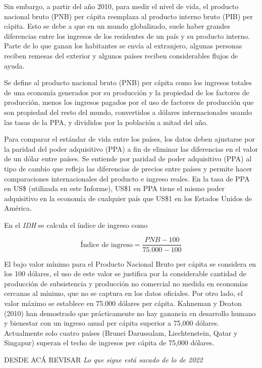 \documentclass[
  10pt,
]{article}
\begin{document}
Sin embargo, a partir del año 2010, para medir el nivel de vida, el
producto nacional bruto (PNB) per cápita reemplaza al producto interno
bruto (PIB) per cápita. Esto se debe a que en un mundo globalizado,
suele haber grandes diferencias entre los ingresos de los residentes de
un país y su producto interno. Parte de lo que ganan los habitantes se
envía al extranjero, algunas personas reciben remesas del exterior y
algunos países reciben considerables flujos de ayuda.

Se define al producto nacional bruto (PNB) per cápita como los ingresos
totales de una economía generados por su producción y la propiedad de
los factores de producción, menos los ingresos pagados por el uso de
factores de producción que son propiedad del resto del mundo,
convertidos a dólares internacionales usando las tasas de la PPA, y
divididos por la población a mitad del año.

Para comparar el estándar de vida entre los países, los datos deben
ajustarse por la paridad del poder adquisitivo (PPA) a fin de eliminar
las diferencias en el valor de un dólar entre países. Se entiende por
paridad de poder adquisitivo (PPA) al tipo de cambio que refleja las
diferencias de precios entre países y permite hacer comparaciones
internacionales del producto e ingreso reales. En la tasa de PPA en US\$
(utilizada en este Informe), US\$1 en PPA tiene el mismo poder
adquisitivo en la economía de cualquier país que US\$1 en los Estados
Unidos de América.

En el \emph{IDH} se calcula el índice de ingreso como

\[\text{Índice de ingreso} = \frac{PNB - 100}{75.000-100}\]

El bajo valor mínimo para el Producto Nacional Bruto per cápita se
considera en los 100 dólares, el uso de este valor se justifica por la
considerable cantidad de producción de subsistencia y producción no
comercial no medida en economías cercanas al mínimo, que no se captura
en los datos oficiales. Por otro lado, el valor máximo se establece en
75.000 dólares per cápita. Kahneman y Deaton (2010) han demostrado que
prácticamente no hay ganancia en desarrollo humano y bienestar con un
ingreso anual per cápita superior a 75,000 dólares. Actualmente solo
cuatro países (Brunei Darussalam, Liechtenstein, Qatar y Singapur)
superan el techo de ingresos per cápita de 75,000 dólares.

DESDE ACÁ REVISAR \emph{Lo que sigue está sacado de lo de 2022}
\end{document}
